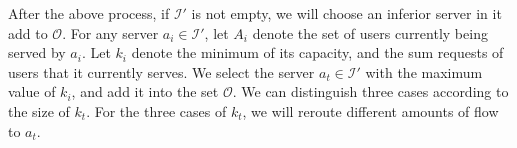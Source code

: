 \documentclass[journal]{IEEEtran}
\begin{document}
After the above process, if $\mathcal{I}'$ is not empty, we will choose an inferior server in it add to $\mathcal{O}$. For any server $a_i \in \mathcal{I}'$, let $A_i$ denote the set of users currently being served by $a_i$. Let $k_i$ denote the minimum of its capacity, and the sum requests of users that it currently serves. We select the server $a_t \in \mathcal{I}'$ with the maximum value of $k_i$, and add it into the set $\mathcal{O}$. 
We can distinguish three cases according to the size of $k_t$. For the three cases of $k_t$, we will reroute different amounts of flow to $a_t$. 
\end{document}
